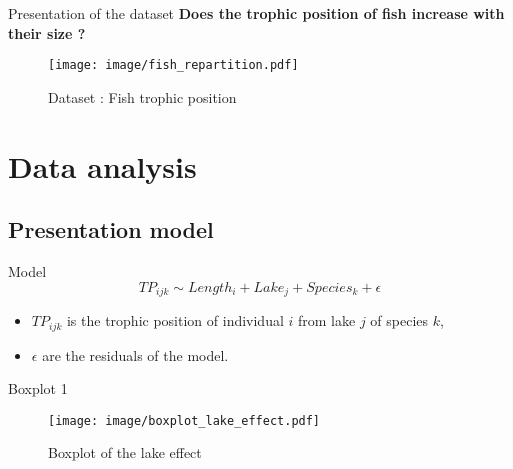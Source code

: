 \documentclass[unknownkeysallowed]{beamer}
\begin{document}
\begin{frame}{Presentation of the dataset}
\vspace{0.5cm}
\textbf{Does the trophic position of fish increase with their size ?}
\begin{figure}
    \centering
    \texttt{[image: image/fish\_repartition.pdf]}
    \caption{Dataset : Fish trophic position}
    \label{fig:my_label}
\end{figure}
\end{frame}

\section{Data analysis}
\label{sec:data analysis}

\subsection{Presentation model}
\label{sub:presentation model}

\begin{frame}{Model}
{\[TP_{ijk} \sim Length_i + Lake_j + Species_k + \epsilon\]}
\medskip
\begin{itemize}
    \item $TP_{ijk}$ is the trophic position of individual $i$ from lake $j$ of species $k$,
    \item $\epsilon$ are the residuals of the model.
\end{itemize}


\end{frame}

\begin{frame}{Boxplot 1}

\begin{figure}
    \centering
    \texttt{[image: image/boxplot\_lake\_effect.pdf]}
    \caption{Boxplot of the lake effect}
    \label{fig:my_label}
\end{figure}


\end{frame}
\end{document}
